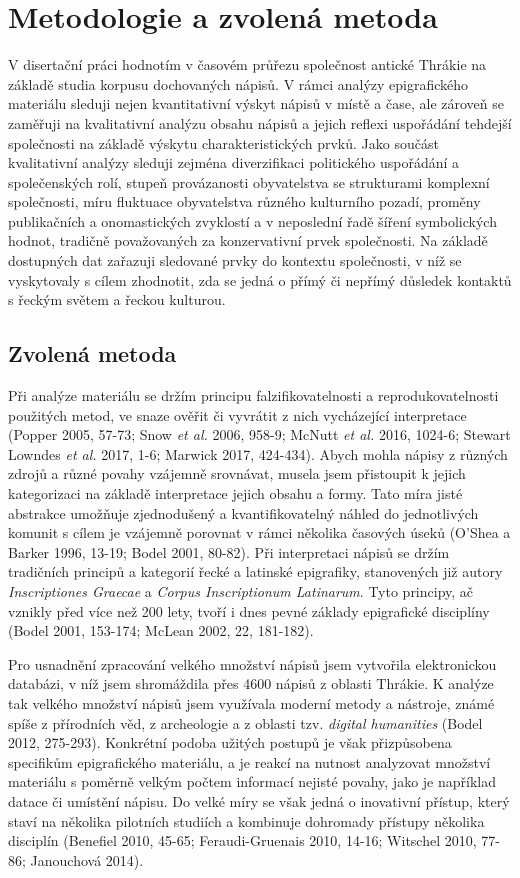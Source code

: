 \chapter{Metodologie a zvolená metoda}
V disertační práci hodnotím v časovém průřezu společnost antické Thrákie na základě studia korpusu dochovaných nápisů. V rámci analýzy epigrafického materiálu sleduji nejen kvantitativní výskyt nápisů v místě a čase, ale zároveň se zaměřuji na kvalitativní analýzu obsahu nápisů a jejich reflexi uspořádání tehdejší společnosti na základě výskytu charakteristických prvků. Jako součást kvalitativní analýzy sleduji zejména diverzifikaci politického uspořádání a společenských rolí, stupeň provázanosti obyvatelstva se strukturami komplexní společnosti, míru fluktuace obyvatelstva různého kulturního pozadí, proměny publikačních a onomastických zvyklostí a v neposlední řadě šíření symbolických hodnot, tradičně považovaných za konzervativní prvek společnosti. Na základě dostupných dat zařazuji sledované prvky do kontextu společnosti, v níž se vyskytovaly s cílem zhodnotit, zda se jedná o přímý či nepřímý důsledek kontaktů s řeckým světem a řeckou kulturou.

\section[zvolená-metoda]{Zvolená metoda}

Při analýze materiálu se držím principu falzifikovatelnosti a reprodukovatelnosti použitých metod, ve snaze ověřit či vyvrátit z nich vycházející interpretace (Popper 2005, 57-73; Snow {\em et al.} 2006, 958-9; McNutt {\em et al.} 2016, 1024-6; Stewart Lowndes {\em et al.} 2017, 1-6; Marwick 2017, 424-434). Abych mohla nápisy z různých zdrojů a různé povahy vzájemně srovnávat, musela jsem přistoupit k jejich kategorizaci na základě interpretace jejich obsahu a formy. Tato míra jisté abstrakce umožňuje zjednodušený a kvantifikovatelný náhled do jednotlivých komunit s cílem je vzájemně porovnat v rámci několika časových úseků (O'Shea a Barker 1996, 13-19; Bodel 2001, 80-82). Při interpretaci nápisů se držím tradičních principů a kategorií řecké a latinské epigrafiky, stanovených již autory {\em Inscriptiones Graecae} a {\em Corpus Inscriptionum Latinarum}. Tyto principy, ač vznikly před více než 200 lety, tvoří i dnes pevné základy epigrafické disciplíny (Bodel 2001, 153-174; McLean 2002, 22, 181-182).

Pro usnadnění zpracování velkého množství nápisů jsem vytvořila elektronickou databázi, v níž jsem shromáždila přes 4600 nápisů z oblasti Thrákie. K analýze tak velkého množství nápisů jsem využívala moderní metody a nástroje, známé spíše z přírodních věd, z archeologie a z oblasti tzv. {\em digital humanities} (Bodel 2012, 275-293). Konkrétní podoba užitých postupů je však přizpůsobena specifikům epigrafického materiálu, a je reakcí na nutnost analyzovat množství materiálu s poměrně velkým počtem informací nejisté povahy, jako je například datace či umístění nápisu. Do velké míry se však jedná o inovativní přístup, který staví na několika pilotních studiích a kombinuje dohromady přístupy několika disciplín (Benefiel 2010, 45-65; Feraudi-Gruenais 2010, 14-16; Witschel 2010, 77-86; Janouchová 2014).


